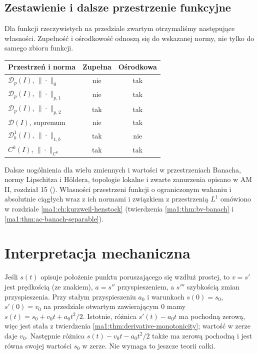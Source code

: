 \subsection{Zestawienie i dalsze przestrzenie funkcyjne}

Dla funkcji rzeczywistych na przedziale zwartym
otrzymaliśmy następujące własności. Zupełność
i ośrodkowość odnoszą się do wskazanej normy,
nie tylko do samego zbioru funkcji.

\begin{center}
\small
\begin{tabular}{lcc}
Przestrzeń i norma & Zupełna & Ośrodkowa\\ \hline
$\mathcal D_p(I)$, $\|\cdot\|_0$ & nie & tak\\
$\mathcal D_p(I)$, $\|\cdot\|_{p,1}$ & nie & tak\\
$\mathcal D_p(I)$, $\|\cdot\|_{p,2}$ & tak & tak\\
$\mathcal D(I)$, supremum & nie & tak\\
$\mathcal D_b^1(I)$, $\|\cdot\|_{1,b}$ & tak & nie\\
$C^k(I)$, $\|\cdot\|_{C^k}$ & tak & tak
\end{tabular}
\end{center}

Dalsze uogólnienia dla wielu zmiennych i wartości
w przestrzeniach Banacha, normy Lipschitza i H\"oldera,
topologie lokalne i zwarte zanurzenia opisano w
AM II, rozdział 15
().
Własności przestrzeni funkcji o ograniczonym
wahaniu i absolutnie ciągłych wraz z ich normami
i związkiem z przestrzenią $L^1$ omówiono
w rozdziale \ref{ma1:ch:kurzweil-henstock}
(twierdzenia \ref{ma1:thm:bv-banach}
i \ref{ma1:thm:ac-banach-separable}).

\section{Interpretacja mechaniczna}
Jeśli $s(t)$ opisuje położenie punktu poruszającego się wzdłuż prostej, to $v=s'$ jest prędkością (ze znakiem), $a=s''$ przyspieszeniem, a $s'''$ szybkością zmian przyspieszenia. Przy stałym przyspieszeniu $a_0$ i warunkach $s(0)=s_0$, $s'(0)=v_0$ na przedziale otwartym zawierającym $0$ mamy $s(t)=s_0+v_0t+a_0t^2/2$. Istotnie, różnica $s'(t)-a_0t$ ma pochodną zerową, więc jest stała z twierdzenia \ref{ma1:thm:derivative-monotonicity}; wartość w zerze daje $v_0$. Następnie różnica $s(t)-v_0t-a_0t^2/2$ także ma zerową pochodną i jest równa swojej wartości $s_0$ w zerze. Nie wymaga to jeszcze teorii całki.

